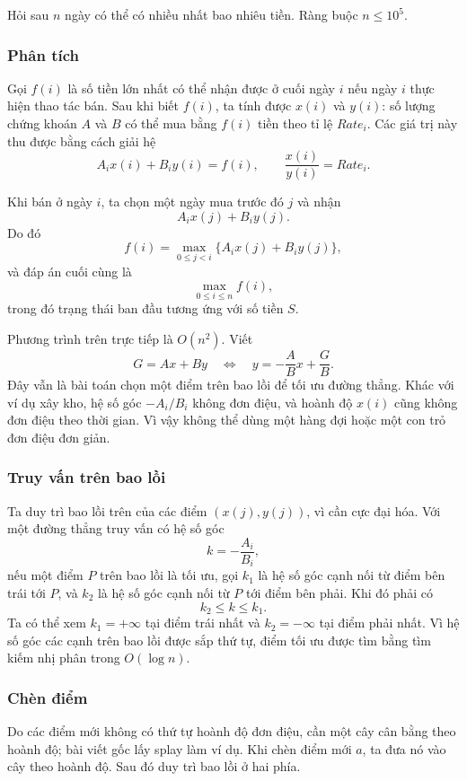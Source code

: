 \documentclass[11pt]{article}
\begin{document}
Hỏi sau $n$ ngày có thể có nhiều nhất bao nhiêu tiền. Ràng buộc
$n\le 10^5$.

\subsubsection*{Phân tích}

Gọi $f(i)$ là số tiền lớn nhất có thể nhận được ở cuối ngày $i$ nếu ngày $i$
thực hiện thao tác bán. Sau khi biết $f(i)$, ta tính được $x(i)$ và $y(i)$:
số lượng chứng khoán $A$ và $B$ có thể mua bằng $f(i)$ tiền theo tỉ lệ
$Rate_i$. Các giá trị này thu được bằng cách giải hệ
\[
  A_i x(i)+B_i y(i)=f(i),\qquad \frac{x(i)}{y(i)}=Rate_i.
\]

Khi bán ở ngày $i$, ta chọn một ngày mua trước đó $j$ và nhận
\[
  A_i x(j)+B_i y(j).
\]
Do đó
\[
  f(i)=\max_{0\le j<i}\{A_i x(j)+B_i y(j)\},
\]
và đáp án cuối cùng là
\[
  \max_{0\le i\le n} f(i),
\]
trong đó trạng thái ban đầu tương ứng với số tiền $S$.

Phương trình trên trực tiếp là $O(n^2)$. Viết
\[
  G=Ax+By
  \quad\Longleftrightarrow\quad
  y=-\frac{A}{B}x+\frac{G}{B}.
\]
Đây vẫn là bài toán chọn một điểm trên bao lồi để tối ưu đường thẳng. Khác
với ví dụ xây kho, hệ số góc $-A_i/B_i$ không đơn điệu, và hoành độ $x(i)$
cũng không đơn điệu theo thời gian. Vì vậy không thể dùng một hàng đợi hoặc
một con trỏ đơn điệu đơn giản.

\subsubsection*{Truy vấn trên bao lồi}

Ta duy trì bao lồi trên của các điểm $(x(j),y(j))$, vì cần cực đại hóa. Với
một đường thẳng truy vấn có hệ số góc
\[
  k=-\frac{A_i}{B_i},
\]
nếu một điểm $P$ trên bao lồi là tối ưu, gọi $k_1$ là hệ số góc cạnh nối từ
điểm bên trái tới $P$, và $k_2$ là hệ số góc cạnh nối từ $P$ tới điểm bên
phải. Khi đó phải có
\[
  k_2\le k\le k_1.
\]
Ta có thể xem $k_1=+\infty$ tại điểm trái nhất và $k_2=-\infty$ tại điểm phải
nhất. Vì hệ số góc các cạnh trên bao lồi được sắp thứ tự, điểm tối ưu được
tìm bằng tìm kiếm nhị phân trong $O(\log n)$.

\subsubsection*{Chèn điểm}

Do các điểm mới không có thứ tự hoành độ đơn điệu, cần một cây cân bằng theo
hoành độ; bài viết gốc lấy splay làm ví dụ. Khi chèn điểm mới $a$, ta đưa nó
vào cây theo hoành độ. Sau đó duy trì bao lồi ở hai phía.
\end{document}
